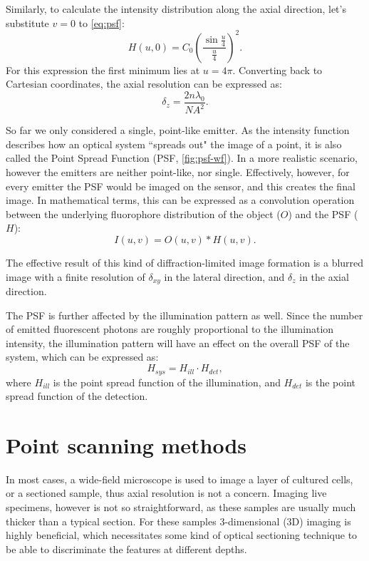     Similarly, to calculate the intensity distribution along the axial direction, let's substitute $v=0$ to \autoref{eq:psf}:
    \begin{equation}
      H(u,0)=C_0\left( \frac{\sin \frac{u}{4}}{\frac{u}{4}}\right) ^2 . 
    \end{equation} 
    For this expression the first minimum lies at $u=4\pi$. Converting back to Cartesian coordinates, the axial resolution can be expressed as:
    \begin{equation}
      \delta_z = \frac{2n\lambda_0}{NA^2}.
      \label{eq:axialRes}
    \end{equation}

    So far we only considered a single, point-like emitter. As the intensity function describes how an optical system ``spreads out" the image of a point, it is also called the Point Spread Function (PSF, \autoref{fig:psf-wf}). In a more realistic scenario, however the emitters are neither point-like, nor single. Effectively, however, for every emitter the PSF would be imaged on the sensor, and this creates the final image. In mathematical terms, this can be expressed as a convolution operation between the underlying fluorophore distribution of the object ($O$) and the PSF ($H$):
    \begin{equation}
      I(u,v) = O(u,v) * H(u,v).
    \end{equation}

    The effective result of this kind of diffraction-limited image formation is a blurred image with a finite resolution of $\delta_{xy}$ in the lateral direction, and $\delta_z$ in the axial direction.

    The PSF is further affected by the illumination pattern as well. Since the number of emitted fluorescent photons are roughly proportional to the illumination intensity, the illumination pattern will have an effect on the overall PSF of the system, which can be expressed as:
    \begin{equation}
      H_{sys} = H_{ill} \cdot H_{det},
      \label{eq:systemPSF}
    \end{equation}
    where $H_{ill}$ is the point spread function of the illumination, and $H_{det}$ is the point spread function of the detection.



\section{Point scanning methods}
  In most cases, a wide-field microscope is used to image a layer of cultured cells, or a sectioned sample, thus axial resolution is not a concern. Imaging live specimens, however is not so straightforward, as these samples are usually much thicker than a typical section. For these samples 3-dimensional (3D) imaging is highly beneficial, which necessitates some kind of optical sectioning technique to be able to discriminate the features at different depths.


